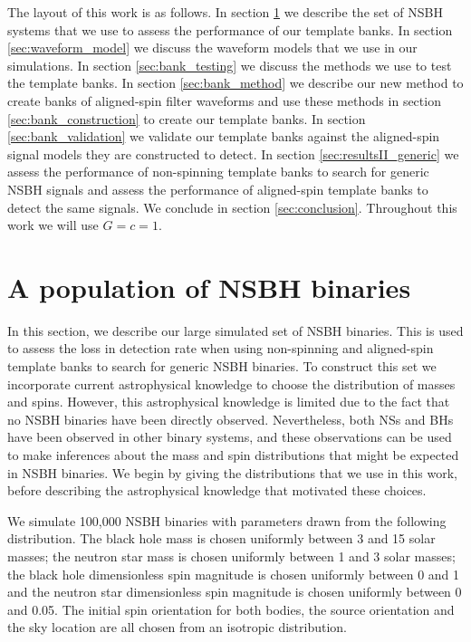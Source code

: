 The layout of this work is as follows. In section \ref{sec:nsbhpop} we describe
the set of \ac{NSBH} systems that we use to assess
the performance of our template banks. In section \ref{sec:waveform_model} we
discuss the waveform models that we use in our simulations. In section
\ref{sec:bank_testing} we discuss the methods we use to test the template
banks. In section \ref{sec:bank_method} we describe our new method to
create banks of aligned-spin filter waveforms and use these methods in section
\ref{sec:bank_construction} to create our template banks. In section
\ref{sec:bank_validation} we validate our template banks against the
aligned-spin signal models they are constructed to detect. In section
\ref{sec:resultsII_generic} we assess the performance of non-spinning template 
banks to search for generic \ac{NSBH} signals and assess the performance of 
aligned-spin template banks to detect the same signals. We conclude in section 
\ref{sec:conclusion}. Throughout this work we will use $G = c = 1$.

\section{A population of NSBH binaries}
\label{sec:nsbhpop}

In this section, we describe our large simulated set of \ac{NSBH} binaries. 
This is used to assess the loss in detection rate when using
non-spinning and
aligned-spin template banks to search for generic \ac{NSBH} binaries. To
construct this set we incorporate current astrophysical knowledge to choose the
distribution of masses and spins. However, this astrophysical knowledge is 
limited due to the fact that no \ac{NSBH} binaries have been directly 
observed. Nevertheless, both
\acp{NS} and \acp{BH} have been observed in other binary systems, and these
observations can be used to make inferences about the mass and spin
distributions that might be expected in \ac{NSBH} binaries.
We begin by giving the distributions that we use in this work, before 
describing the astrophysical knowledge that motivated these choices.

We simulate 100,000 \ac{NSBH}
binaries with parameters drawn from the following distribution.
The black hole mass is chosen uniformly between 3 and 15 solar masses;
the neutron star mass is chosen uniformly between 1 and 3 solar masses; the
black hole dimensionless spin magnitude is chosen uniformly between 0 and 1 and
the neutron star dimensionless spin magnitude is chosen uniformly between 0 and
0.05. The initial spin orientation for both bodies, the source orientation and
the sky location are all chosen from an isotropic distribution.

